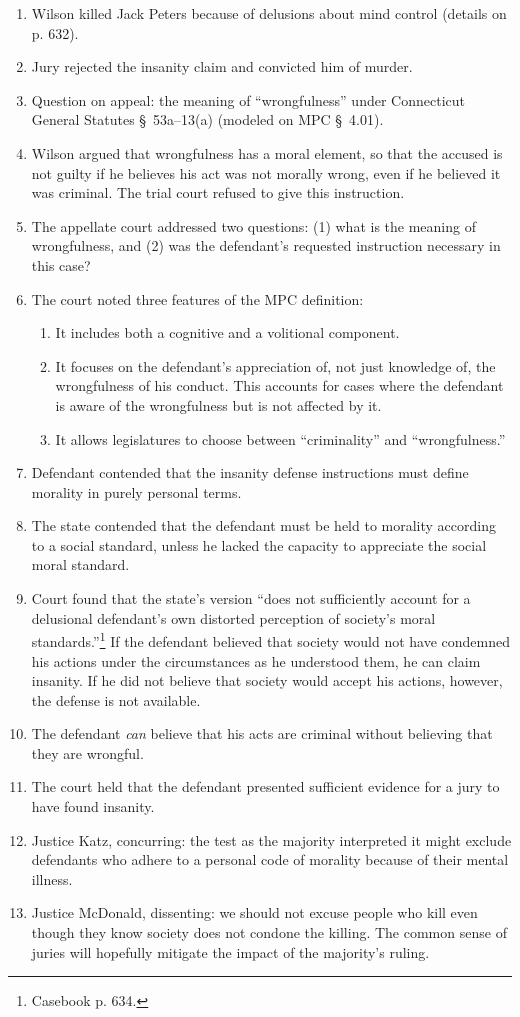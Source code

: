 \begin{enumerate}
    \item Wilson killed Jack Peters because of delusions about mind control (details on p. 632).
    \item Jury rejected the insanity claim and convicted him of murder. 
    \item Question on appeal: the meaning of ``wrongfulness'' under Connecticut General Statutes § 53a--13(a) (modeled on MPC § 4.01).
    \item Wilson argued that wrongfulness has a moral element, so that the accused is not guilty if he believes his act was not morally wrong, even if he believed it was criminal. The trial court refused to give this instruction.
    \item The appellate court addressed two questions: (1) what is the meaning of wrongfulness, and (2) was the defendant's requested instruction necessary in this case?
    \item The court noted three features of the MPC definition:
    \begin{enumerate}
        \item It includes both a cognitive and a volitional component.
        \item It focuses on the defendant's appreciation of, not just knowledge of, the wrongfulness of his conduct. This accounts for cases where the defendant is aware of the wrongfulness but is not affected by it.
        \item It allows legislatures to choose between ``criminality'' and ``wrongfulness.''
    \end{enumerate}
    \item Defendant contended that the insanity defense instructions must define morality in purely personal terms.
    \item The state contended that the defendant must be held to morality according to a social standard, unless he lacked the capacity to appreciate the social moral standard.
    \item Court found that the state's version ``does not sufficiently account for a delusional defendant's own distorted perception of society's moral standards.''\footnote{Casebook p. 634.} If the defendant believed that society would not have condemned his actions under the circumstances as he understood them, he can claim insanity. If he did not believe that society would accept his actions, however, the defense is not available.
    \item The defendant \emph{can} believe that his acts are criminal without believing that they are wrongful.
    \item The court held that the defendant presented sufficient evidence for a jury to have found insanity.
    \item Justice Katz, concurring: the test as the majority interpreted it might exclude defendants who adhere to a personal code of morality because of their mental illness.
    \item Justice McDonald, dissenting: we should not excuse people who kill even though they know society does not condone the killing. The common sense of juries will hopefully mitigate the impact of the majority's ruling.
\end{enumerate}
